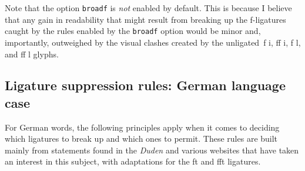 \documentclass[11pt]{article}
\newcommand{\opt}[1]{\texttt{#1}}
\begin{document}
Note that the option \opt{broadf} is \emph{not} enabled by default. This is because I believe that any gain in readability that might result from breaking up the f-ligatures caught by the rules enabled by the \opt{broadf} option would be minor and, importantly, outweighed by the visual clashes created by the unligated~f\kern0pt i, ff\kern0pt i, f\kern0pt l, and ff\kern0pt l glyphs.



\subsection{Ligature suppression rules: German language case}

For German words, the following principles apply when it comes to deciding which ligatures to break up and which ones to permit. These rules are built mainly from statements found in the \emph{Duden} and various websites that have taken an interest in this subject, with adaptations for the ft and fft ligatures.
\end{document}
